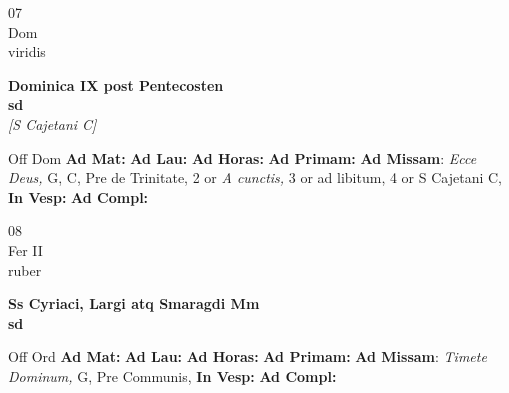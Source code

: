 \documentclass[10pt, openany]{book}
\begin{document}
        \begin{center}
            \begin{minipage}{3.5in}
                \vspace{2em}
                \begin{minipage}{0.5in}
                    {\Huge 07} \\
                    {\normalsize Dom} \\
                    {\normalsize viridis}
                \end{minipage}
                \begin{minipage}{3.0in}
                    \textbf{ \large Dominica IX post Pentecosten \\
                    \textnormal{\normalsize sd}} \\ \textit{[S Cajetani C]} \\ 
                \end{minipage}
                \begin{justify}Off Dom
                    \textbf{Ad Mat: }
                    \textbf{Ad Lau: }
                    \textbf{Ad Horas: }
                    \textbf{Ad Primam: }\textbf{Ad Missam}: \textit{Ecce Deus,} G, C, Pre de Trinitate, 2 or \textit{A cunctis,} 3 or ad libitum, 4 or S Cajetani C,  
                    \textbf{In Vesp: }
                    \textbf{Ad Compl: }
                \end{justify}
            \end{minipage}
        \end{center}
    
        \begin{center}
            \begin{minipage}{3.5in}
                \vspace{2em}
                \begin{minipage}{0.5in}
                    {\Huge 08} \\
                    {\normalsize Fer II} \\
                    {\normalsize ruber}
                \end{minipage}
                \begin{minipage}{3.0in}
                    \textbf{ \large Ss Cyriaci, Largi atq Smaragdi Mm \\
                    \textnormal{\normalsize sd}} \\ 
                \end{minipage}
                \begin{justify}Off Ord
                    \textbf{Ad Mat: }
                    \textbf{Ad Lau: }
                    \textbf{Ad Horas: }
                    \textbf{Ad Primam: }\textbf{Ad Missam}: \textit{Timete Dominum,} G, Pre Communis,  
                    \textbf{In Vesp: }
                    \textbf{Ad Compl: }
                \end{justify}
            \end{minipage}
        \end{center}
    
\end{document}
